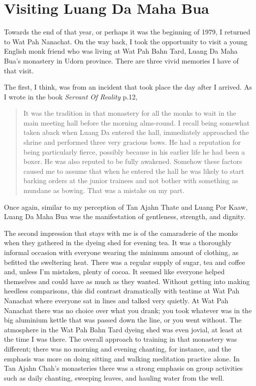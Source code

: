 \chapter{Visiting Luang Da Maha Bua}

Towards the end of that year, or perhaps it was the beginning of 1979, I
returned to Wat Pah Nanachat. On the way back, I took the opportunity to
visit a young English monk friend who was living at Wat Pah Bahn Tard,
Luang Da Maha Bua's monastery in Udorn province. There are three vivid
memories I have of that visit.

The first, I think, was from an incident that took place the day after I
arrived. As I wrote in the book \emph{Servant Of Reality}\cite{servant} p.12,

\begin{quotation}
It was the tradition in that monastery for all the monks to wait in the
main meeting hall before the morning alms-round. I recall being somewhat
taken aback when Luang Da entered the hall, immediately approached the
shrine and performed three very gracious bows. He had a reputation for
being particularly fierce, possibly because in his earlier life he had
been a boxer. He was also reputed to be fully awakened. Somehow these
factors caused me to assume that when he entered the hall he was likely
to start barking orders at the junior trainees and not bother with
something as mundane as bowing. That was a mistake on my part.
\end{quotation}

Once again, similar to my perception of Tan Ajahn Thate and Luang Por
Kaaw, Luang Da Maha Bua was the manifestation of gentleness, strength,
and dignity.

The second impression that stays with me is of the camaraderie of the
monks when they gathered in the dyeing shed for evening tea. It was a
thoroughly informal occasion with everyone wearing the minimum amount of
clothing, as befitted the sweltering heat. There was a regular supply of
sugar, tea and coffee and, unless I'm mistaken, plenty of cocoa. It
seemed like everyone helped themselves and could have as much as they
wanted. Without getting into making heedless comparisons, this did
contrast dramatically with teatime at Wat Pah Nanachat where everyone
sat in lines and talked very quietly. At Wat Pah Nanachat there was no
choice over what you drank; you took whatever was in the big aluminium
kettle that was passed down the line, or you went without. The
atmosphere in the Wat Pah Bahn Tard dyeing shed was even jovial, at
least at the time I was there. The overall approach to training in that
monastery was different; there was no morning and evening chanting, for
instance, and the emphasis was more on doing sitting and walking
meditation practice alone. In Tan Ajahn Chah's monasteries there was a
strong emphasis on group activities such as daily chanting, sweeping
leaves, and hauling water from the well.

